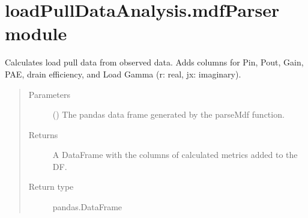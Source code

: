 \documentclass[letterpaper,10pt,openany,oneside,english]{sphinxmanual}
\begin{document}
\chapter{loadPullDataAnalysis.mdfParser module}
\label{\detokenize{index:module-loadPullDataAnalysis.mdfParser}}\label{\detokenize{index:loadpulldataanalysis-mdfparser-module}}

\begin{fulllineitems}
\label{\detokenize{index:loadPullDataAnalysis.mdfParser.calculateMetrics}}
\sphinxAtStartPar
Calculates load pull data from observed data.
Adds columns for Pin, Pout, Gain, PAE, drain efficiency,
and Load Gamma (r: real, jx: imaginary).
\begin{quote}\begin{description}
\item[{Parameters}] \leavevmode
\sphinxAtStartPar
{} () \textendash{} The pandas data frame generated by the parseMdf function.

\item[{Returns}] \leavevmode
\sphinxAtStartPar
A DataFrame with the columns of calculated metrics added to the DF.

\item[{Return type}] \leavevmode
\sphinxAtStartPar
pandas.DataFrame

\end{description}\end{quote}

\end{fulllineitems}

\end{document}
